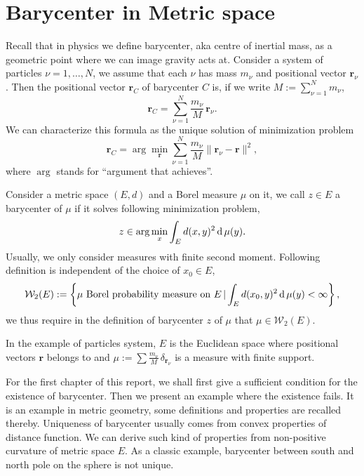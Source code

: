 \chapter{Barycenter in Metric space}
Recall that in physics we define barycenter, aka centre of inertial mass,
as a geometric point where we can image gravity acts at.
Consider a system of particles  $\nu = 1, \ldots , N$,
we assume that each $\nu$ has mass $m_\nu$ and positional vector $\boldsymbol{r}_\nu$.
Then the positional vector $\boldsymbol{r}_C$ of barycenter $C$ is,
if we write \( M := \sum _ { \nu = 1 } ^ { N } m _ { \nu }\),
\[
	\boldsymbol { r }_ { C } =
	\sum_ { \nu = 1 } ^ { N } \frac{m_ { \nu } }{M}\,\boldsymbol { r }_ { \nu }.
\]
We can characterize this formula as the unique solution of minimization problem
\begin{equation}
	\label{barycenter_def}
	\boldsymbol{r}_C = \arg \min_{\boldsymbol{r}} \sum_{\nu= 1}^N \frac{m_\nu}{M}
	\|\boldsymbol{r}_{\nu} - \boldsymbol{r}\|^2,
\end{equation}
where $\arg$ stands for ``argument that achieves''.

\begin{defn}
	Consider a metric space $(E,d)$ and a Borel measure $\mu$ on it,
	we call $z \in E$ a barycenter of $\mu$ if it solves following minimization problem,
	\[
		z \in \arg\min_{x}\int_{E} d(x, y)^2 \operatorname{d} \mu (y).
	\]
	Usually, we only consider measures with finite second moment.
	Following definition is independent of the choice of $x_0 \in E$,
	\[
					\mathcal{W}_2(E): = \left\{ \mu \text{ Borel probability measure on } E \, |
		\int_{E} d(x_0, y)^2 \operatorname{d} \mu (y) < \infty\right\},
	\]
	we thus require in the definition of barycenter $z$ of $\mu$ that $\mu \in \mathcal{W}_2(E)$.
\end{defn}
\begin{rmk}
	In the example of particles system,
	$E$ is the Euclidean space where positional vectors $\boldsymbol{r}$ belongs to
	and $\mu := \sum \frac{m_\nu}{M} \, \delta_{\boldsymbol{r}_\nu}$ is a measure with finite support.
\end{rmk}

For the first chapter of this report, we shall first give a sufficient condition for the existence of barycenter.
Then we present an example where the existence fails.
It is an example in metric geometry,
some definitions and properties are recalled thereby.
Uniqueness of barycenter usually comes from convex properties of distance function.
We can derive such kind of properties from non-positive curvature of metric space $E$.
As a classic example, barycenter between south and north pole on the sphere is not unique.

